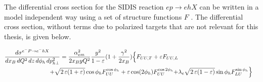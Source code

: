 
The differential cross section for the SIDIS reaction $ep \rightarrow ehX$ can be written in a model independent way using a set of structure functions $F$ \cite{mulders}.  The differential cross section, without terms due to polarized targets that are not relevant for this thesis, is given below.

\begin{eqnarray}
  \frac{d\sigma^{e^-P\to e^-hX}}{dx_B \, dQ^{2}\, dz\, d\phi_h\, d p_{h\perp}^2} = \frac{\alpha^2_{em}}{2x_B y Q^2} \frac{y^2}{1-\varepsilon}  ( 1+\frac{\gamma^2}{2x_B} ) \Bigl\{ F_{UU ,T} +  \varepsilon F_{UU ,L} \nonumber \\
  + \sqrt{2\,\varepsilon (1+\varepsilon)} \cos\phi_h F_{UU}^{\cos\phi_h}+ \varepsilon \cos(2\phi_h) F_{UU}^{\cos 2\phi_h} +& \lambda_e
\sqrt{2\,\varepsilon (1-\varepsilon)} \sin\phi_h F_{LU}^{\sin\phi_h} \Bigr\}
\end{eqnarray}

